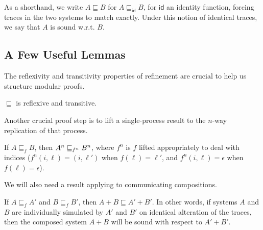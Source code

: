 As a shorthand, we write $A \sqsubseteq B$ for $A \sqsubseteq_\mathsf{id} B$,
for $\mathsf{id}$ an identity function, forcing traces in the two systems to
match exactly. Under this notion of identical traces, we say that $A$
is sound w.r.t. $B$.

\subsection{A Few Useful Lemmas}

The reflexivity and transitivity properties of refinement are crucial to help us
structure modular proofs.

\begin{theorem}\label{transitive}
$\sqsubseteq$ is reflexive and transitive.
\end{theorem}

Another crucial proof step is to lift a single-process result to the $n$-way
replication of that process.

\begin{theorem}\label{liftn}
If $A \sqsubseteq_f B$, then $\smulti{n}{A} \sqsubseteq_{f^n} \smulti{n}{B}$, where
$f^n$ is $f$ lifted appropriately to deal with indices ($f^n(i, \ell) =
(i, \ell')$ when $f(\ell) = \ell'$, and $f^n(i, \ell) = \epsilon$ when
$f(\ell) = \epsilon$).
\end{theorem}

We will also need a result applying to communicating compositions.

\begin{theorem}\label{liftplus}
If $A \sqsubseteq_f A'$ and $B \sqsubseteq_f B'$, then $A + B \sqsubseteq A' +
B'$. In other words, if systems $A$ and $B$ are individually simulated by $A'$ and
$B'$ on identical alteration of the traces, then the composed
system $A+B$ will be sound with respect to $A'+B'$.
\end{theorem}

